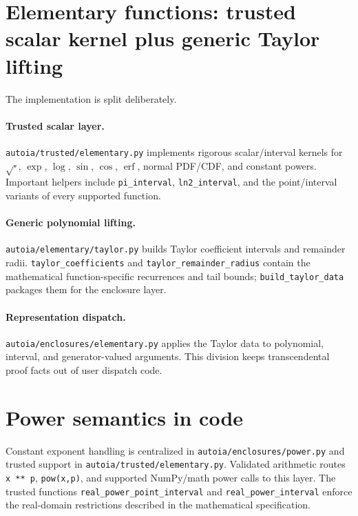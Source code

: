 \documentclass[11pt]{article}
\newcommand{\codepath}[1]{\nolinkurl{#1}}
\begin{document}
\section{Elementary functions: trusted scalar kernel plus generic Taylor lifting}

The implementation is split deliberately.

\paragraph{Trusted scalar layer.}
\codepath{autoia/trusted/elementary.py} implements rigorous scalar/interval
kernels for \(\sqrt{\cdot}\), \(\exp\), \(\log\), \(\sin\), \(\cos\),
\(\operatorname{erf}\), normal PDF/CDF, and constant powers.  Important helpers
include \texttt{pi\_interval}, \texttt{ln2\_interval}, and the point/interval
variants of every supported function.

\paragraph{Generic polynomial lifting.}
\codepath{autoia/elementary/taylor.py} builds Taylor coefficient intervals and
remainder radii.  \texttt{taylor\_coefficients} and
\texttt{taylor\_remainder\_radius} contain the mathematical function-specific
recurrences and tail bounds; \texttt{build\_taylor\_data} packages them for the
enclosure layer.

\paragraph{Representation dispatch.}
\codepath{autoia/enclosures/elementary.py} applies the Taylor data to polynomial,
interval, and generator-valued arguments.  This division keeps transcendental
proof facts out of user dispatch code.

\section{Power semantics in code}

Constant exponent handling is centralized in
\codepath{autoia/enclosures/power.py} and trusted support in
\codepath{autoia/trusted/elementary.py}.  Validated arithmetic routes
\texttt{x ** p}, \texttt{pow(x,p)}, and supported NumPy/math power calls to this
layer.  The trusted functions \texttt{real\_power\_point\_interval} and
\texttt{real\_power\_interval} enforce the real-domain restrictions described in
the mathematical specification.
\end{document}
